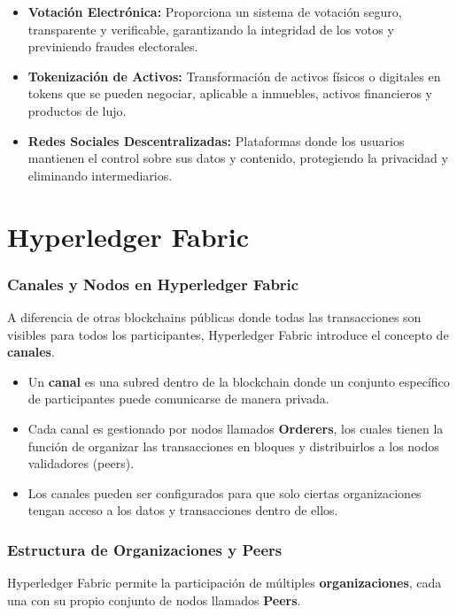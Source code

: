 \begin{itemize}
    \item \textbf{Votación Electrónica:} Proporciona un sistema de votación seguro, transparente y verificable, garantizando la integridad de los votos y previniendo fraudes electorales.
    
    \item \textbf{Tokenización de Activos:} Transformación de activos físicos o digitales en tokens que se pueden negociar, aplicable a inmuebles, activos financieros y productos de lujo.
    
    \item \textbf{Redes Sociales Descentralizadas:} Plataformas donde los usuarios mantienen el control sobre sus datos y contenido, protegiendo la privacidad y eliminando intermediarios.
\end{itemize}

\section{Hyperledger Fabric}
\subsubsection{Canales y Nodos en Hyperledger Fabric}

A diferencia de otras blockchains públicas donde todas las transacciones son visibles para todos los participantes, Hyperledger Fabric introduce el concepto de \textbf{canales}\cite{hyperledgerfabric}.

\begin{itemize}
    \item Un \textbf{canal} es una subred dentro de la blockchain donde un conjunto específico de participantes puede comunicarse de manera privada.
    \item Cada canal es gestionado por nodos llamados \textbf{Orderers}, los cuales tienen la función de organizar las transacciones en bloques y distribuirlos a los nodos validadores (peers).
    \item Los canales pueden ser configurados para que solo ciertas organizaciones tengan acceso a los datos y transacciones dentro de ellos.
\end{itemize}

\subsubsection{Estructura de Organizaciones y Peers}

Hyperledger Fabric permite la participación de múltiples \textbf{organizaciones}\cite{hyperledgerfabric}, cada una con su propio conjunto de nodos llamados \textbf{Peers}.

